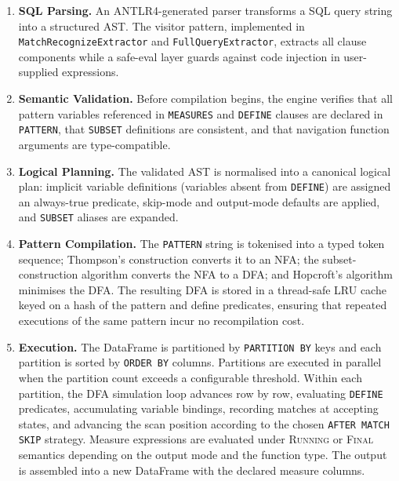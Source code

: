 \begin{enumerate}
  \item \textbf{SQL Parsing.}
    An ANTLR4-generated parser transforms a SQL query string into
    a structured AST.  The visitor pattern, implemented in
    \texttt{MatchRecognizeExtractor} and
    \texttt{FullQueryExtractor}, extracts all clause components
    while a safe-eval layer guards against code injection in
    user-supplied expressions.

  \item \textbf{Semantic Validation.}
    Before compilation begins, the engine verifies that all pattern
    variables referenced in \texttt{MEASURES} and \texttt{DEFINE}
    clauses are declared in \texttt{PATTERN}, that \texttt{SUBSET}
    definitions are consistent, and that navigation function
    arguments are type-compatible.

  \item \textbf{Logical Planning.}
    The validated AST is normalised into a canonical logical plan:
    implicit variable definitions (variables absent from
    \texttt{DEFINE}) are assigned an always-true predicate,
    skip-mode and output-mode defaults are applied, and
    \texttt{SUBSET} aliases are expanded.

  \item \textbf{Pattern Compilation.}
    The \texttt{PATTERN} string is tokenised into a typed token
    sequence; Thompson's construction converts it to an NFA; the
    subset-construction algorithm converts the NFA to a DFA; and
    Hopcroft's algorithm minimises the DFA.  The resulting DFA is
    stored in a thread-safe LRU cache keyed on a hash of the
    pattern and define predicates, ensuring that repeated
    executions of the same pattern incur no recompilation cost.

  \item \textbf{Execution.}
    The DataFrame is partitioned by \texttt{PARTITION BY} keys and
    each partition is sorted by \texttt{ORDER BY} columns.
    Partitions are executed in parallel when the partition count
    exceeds a configurable threshold.  Within each partition, the
    DFA simulation loop advances row by row, evaluating
    \texttt{DEFINE} predicates, accumulating variable bindings,
    recording matches at accepting states, and advancing the scan
    position according to the chosen \texttt{AFTER MATCH SKIP}
    strategy.  Measure expressions are evaluated under
    \textsc{Running} or \textsc{Final} semantics depending on the
    output mode and the function type.  The output is assembled
    into a new DataFrame with the declared measure columns.
\end{enumerate}

